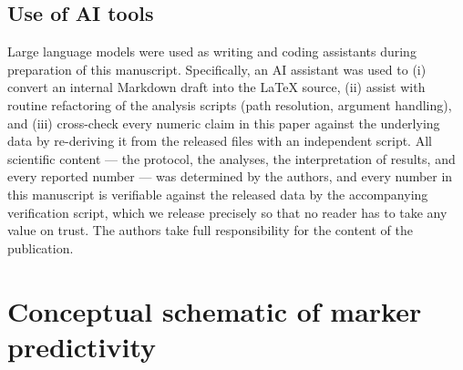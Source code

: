 \documentclass[10pt]{article} %
\begin{document}
\subsection*{Use of AI tools}

Large language models were used as writing and coding assistants during preparation of this manuscript. Specifically, an AI assistant was used to (i) convert an internal Markdown draft into the LaTeX source, (ii) assist with routine refactoring of the analysis scripts (path resolution, argument handling), and (iii) cross-check every numeric claim in this paper against the underlying data by re-deriving it from the released files with an independent script. All scientific content --- the protocol, the analyses, the interpretation of results, and every reported number --- was determined by the authors, and every number in this manuscript is verifiable against the released data by the accompanying verification script, which we release precisely so that no reader has to take any value on trust. The authors take full responsibility for the content of the publication.





\appendix

\section{Conceptual schematic of marker predictivity}
\label{app:concept}
\end{document}
